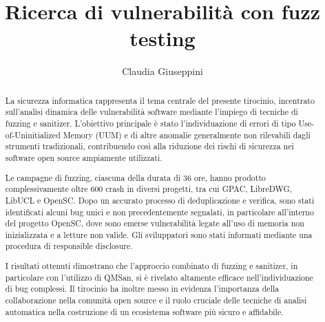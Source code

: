 \documentclass[italian,twoside,binding=0.6cm]{sapthesis}
\title{Ricerca di vulnerabilità con fuzz testing}
\author{Claudia Giuseppini}
\begin{document}
\frontmatter 
\maketitle

\begin{abstract}
La sicurezza informatica rappresenta il tema centrale del presente tirocinio, incentrato sull’analisi dinamica delle vulnerabilità software mediante l’impiego di tecniche di fuzzing e sanitizer. L’obiettivo principale è stato l’individuazione di errori di tipo Use-of-Uninitialized Memory (UUM) e di altre anomalie generalmente non rilevabili dagli strumenti tradizionali, contribuendo così alla riduzione dei rischi di sicurezza nei software open source ampiamente utilizzati.

Le campagne di fuzzing, ciascuna della durata di 36 ore, hanno prodotto complessivamente oltre 600 crash in diversi progetti, tra cui GPAC, LibreDWG, LibUCL e OpenSC. Dopo un accurato processo di deduplicazione e verifica, sono stati identificati alcuni bug unici e non precedentemente segnalati, in particolare all’interno del progetto OpenSC, dove sono emerse vulnerabilità legate all’uso di memoria non inizializzata e a letture non valide. Gli sviluppatori sono stati informati mediante una procedura di responsible disclosure.

I risultati ottenuti dimostrano che l’approccio combinato di fuzzing e sanitizer, in particolare con l’utilizzo di QMSan, si è rivelato altamente efficace nell’individuazione di bug complessi. Il tirocinio ha inoltre messo in evidenza l’importanza della collaborazione nella comunità open source e il ruolo cruciale delle tecniche di analisi automatica nella costruzione di un ecosistema software più sicuro e affidabile.

\end{abstract}

\tableofcontents

\mainmatter






\backmatter %
\cleardoublepage
{}
{}


\end{document}
